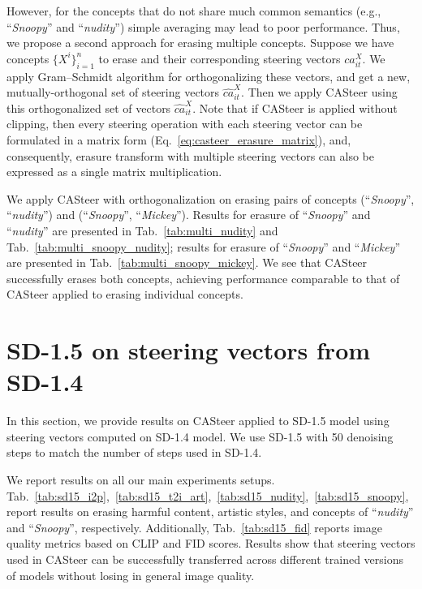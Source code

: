 However, for the concepts that do not share much common semantics (e.g., ``\textit{Snoopy}'' and ``\textit{nudity}'') simple averaging may lead to poor performance. Thus, we propose a second approach for erasing multiple concepts. Suppose we have concepts $\{X^i\}_{i=1}^n$ to erase and their corresponding steering vectors $ca^{X}_{it}$. We apply Gram–Schmidt algorithm for orthogonalizing these vectors, and get a new, mutually-orthogonal set of steering vectors $\widehat{ca}^{X}_{it}$. Then we apply CASteer using this orthogonalized set of vectors $\widehat{ca}^{X}_{it}$. Note that if CASteer is applied without clipping, then every steering operation with each steering vector can be formulated in a matrix form (Eq.~\ref{eq:casteer_erasure_matrix}), and, consequently, erasure transform with multiple steering vectors can also be expressed as a single matrix multiplication.

We apply CASteer with orthogonalization on erasing pairs of concepts (``\textit{Snoopy}'', ``\textit{nudity}'') and (``\textit{Snoopy}'', ``\textit{Mickey}''). Results for erasure of ``\textit{Snoopy}'' and ``\textit{nudity}'' are presented in Tab.~\ref{tab:multi_nudity} and Tab.~\ref{tab:multi_snoopy_nudity}; results for erasure of ``\textit{Snoopy}'' and ``\textit{Mickey}'' are presented in Tab.~\ref{tab:multi_snoopy_mickey}. We see that CASteer successfully erases both concepts, achieving performance comparable to that of CASteer applied to erasing individual concepts.  







\clearpage
\section{SD-1.5 on steering vectors from SD-1.4}
\label{sd15_on_sd14}

In this section, we provide results on CASteer applied to SD-1.5 model using steering vectors computed on SD-1.4 model. We use SD-1.5 with 50 denoising steps to match the number of steps used in SD-1.4. 

We report results on all our main experiments setups. Tab.~\ref{tab:sd15_i2p},~\ref{tab:sd15_t2i_art},~\ref{tab:sd15_nudity},~\ref{tab:sd15_snoopy}, report results on erasing harmful content, artistic styles, and concepts of ``\textit{nudity}'' and ``\textit{Snoopy}'', respectively. Additionally, Tab.~\ref{tab:sd15_fid} reports image quality metrics based on CLIP and FID scores. Results show that steering vectors used in CASteer can be successfully transferred across different trained versions of models without losing in general image quality.


